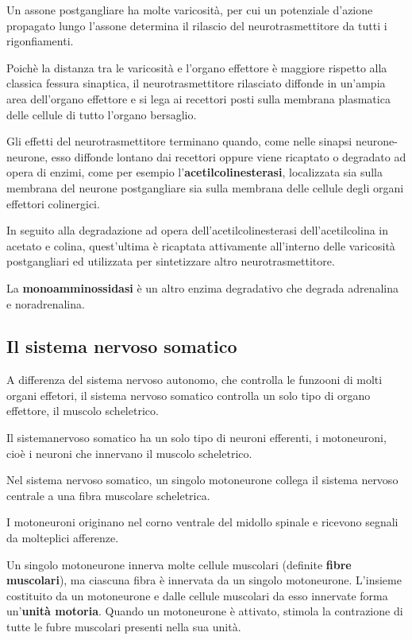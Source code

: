 \documentclass[]{article}
\begin{document}
Un assone postgangliare ha molte varicosità, per cui un potenziale
d'azione propagato lungo l'assone determina il rilascio del
neurotrasmettitore da tutti i rigonfiamenti.

Poichè la distanza tra le varicosità e l'organo effettore è maggiore
rispetto alla classica fessura sinaptica, il neurotrasmettitore
rilasciato diffonde in un'ampia area dell'organo effettore e si lega ai
recettori posti sulla membrana plasmatica delle cellule di tutto
l'organo bersaglio.

Gli effetti del neurotrasmettitore terminano quando, come nelle sinapsi
neurone-neurone, esso diffonde lontano dai recettori oppure viene
ricaptato o degradato ad opera di enzimi, come per esempio
l'\textbf{acetilcolinesterasi}, localizzata sia sulla membrana del
neurone postgangliare sia sulla membrana delle cellule degli organi
effettori colinergici.

In seguito alla degradazione ad opera dell'acetilcolinesterasi
dell'acetilcolina in acetato e colina, quest'ultima è ricaptata
attivamente all'interno delle varicosità postgangliari ed utilizzata per
sintetizzare altro neurotrasmettitore.

La \textbf{monoamminossidasi} è un altro enzima degradativo che degrada
adrenalina e noradrenalina.

\subsection{Il sistema nervoso
somatico}\label{il-sistema-nervoso-somatico}

A differenza del sistema nervoso autonomo, che controlla le funzooni di
molti organi effetori, il sistema nervoso somatico controlla un solo
tipo di organo effettore, il muscolo scheletrico.

Il sistemanervoso somatico ha un solo tipo di neuroni efferenti, i
motoneuroni, cioè i neuroni che innervano il muscolo scheletrico.

Nel sistema nervoso somatico, un singolo motoneurone collega il sistema
nervoso centrale a una fibra muscolare scheletrica.

I motoneuroni originano nel corno ventrale del midollo spinale e
ricevono segnali da molteplici afferenze.

Un singolo motoneurone innerva molte cellule muscolari (definite
\textbf{fibre muscolari}), ma ciascuna fibra è innervata da un singolo
motoneurone. L'insieme costituito da un motoneurone e dalle cellule
muscolari da esso innervate forma un'\textbf{unità motoria}. Quando un
motoneurone è attivato, stimola la contrazione di tutte le fubre
muscolari presenti nella sua unità.
\end{document}
